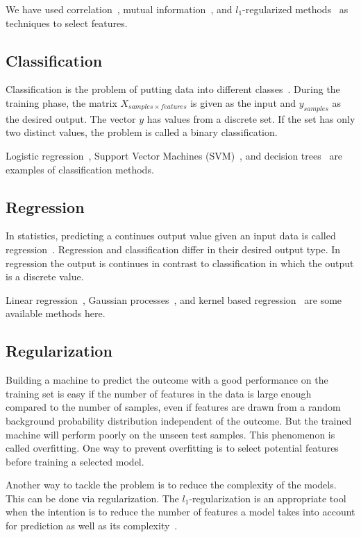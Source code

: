 We have used correlation~\cite{correlation}, mutual information~\cite{mutual-information}, and $l_1$-regularized methods~\cite{l1-regularized} as techniques to select features.

\subsection{Classification}
Classification is the problem of putting data into different classes~\cite[TODO: chapter]{statistical-learning}. During the training phase, the matrix $X_{samples \times features}$ is given as the input and $y_{samples}$ as the desired output. The vector $y$ has values from a discrete set. If the set has only two distinct values, the problem is called a binary classification.

Logistic regression~\cite{logistic-regression1,logistic-regression2}, Support Vector Machines (SVM)~\cite{svm1,svm2}, and decision trees~\cite[TODO:chapter]{statistical-learning} are examples of classification methods.

\subsection{Regression}
In statistics, predicting a continues output value given an input data is called regression~\cite[TODO:chapter]{statistical-learning}. Regression and classification differ in their desired output type. In regression the output is continues in contrast to classification in which the output is a discrete value.

Linear regression~\cite[TODO:chapter]{statistical-learning}, Gaussian processes~\cite{gaussian-processes}, and kernel based regression~\cite[Ch. 9]{learning-with-kernels} are some available methods here.

\subsection{Regularization}
Building a machine to predict the outcome with a good performance on the training set is easy if the number of features in the data is large enough compared to the number of samples, even if features are drawn from a random background probability distribution independent of the outcome. But the trained machine will perform poorly on the unseen test samples. This phenomenon is called overfitting. One way to prevent overfitting is to select potential features before training a selected model.

Another way to tackle the problem is to reduce the complexity of the models. This can be done via regularization. The $l_1$-regularization is an appropriate tool when the intention is to reduce the number of features a model takes into account for prediction as well as its complexity~\cite{l1-regularized}.

